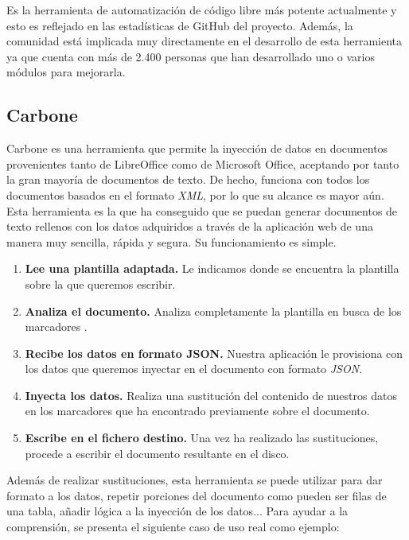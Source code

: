 Es la herramienta de automatización de código libre más potente actualmente y esto es reflejado
en las estadísticas de GitHub del proyecto. Además, la comunidad está implicada muy directamente
en el desarrollo de esta herramienta ya que cuenta con más de 2.400 personas que han desarrollado
uno o varios módulos para mejorarla.

\subsection{Carbone}

Carbone\cite{carbone} es una herramienta que permite la inyección de datos en documentos provenientes tanto de LibreOffice como de Microsoft Office, aceptando por tanto la gran mayoría de documentos de texto. De hecho, funciona con todos los documentos basados en el formato \textit{XML}, por lo que su alcance es mayor aún.\\

Esta herramienta es la que ha conseguido que se puedan generar documentos de texto rellenos con los datos adquiridos a través de la aplicación web de una manera muy sencilla, rápida y segura. Su funcionamiento es simple.\\

\begin{enumerate}
	\item \textbf{Lee una plantilla adaptada.} Le indicamos donde se encuentra la plantilla sobre la que queremos escribir. 
	\item \textbf{Analiza el documento.} Analiza completamente la plantilla en busca de los marcadores {}.  
	\item \textbf{Recibe los datos en formato JSON.} Nuestra aplicación le provisiona con los datos que queremos inyectar en el documento con formato \textit{JSON}.  
	\item \textbf{Inyecta los datos.} Realiza una sustitución del contenido de nuestros datos en los marcadores que ha encontrado previamente sobre el documento.
	\item \textbf{Escribe en el fichero destino.} Una vez ha realizado las sustituciones, procede a escribir el documento resultante en el disco. 
\end{enumerate}

Además de realizar sustituciones, esta herramienta se puede utilizar para dar formato a los datos, repetir porciones del documento como pueden ser filas de una tabla, añadir lógica a la inyección de los datos... Para ayudar a la comprensión, se presenta el siguiente caso de uso real como ejemplo:\\

